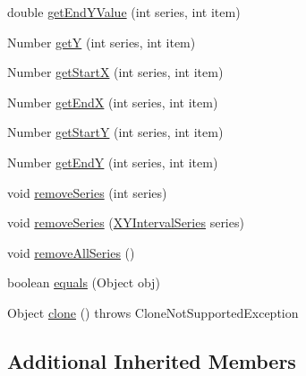 \begin{DoxyCompactItemize}
\item 
double \mbox{\hyperlink{classorg_1_1jfree_1_1data_1_1xy_1_1_x_y_interval_series_collection_af64aae33d2436a5f394e0dd3ebbbbb9f}{get\+End\+Y\+Value}} (int series, int item)
\item 
Number \mbox{\hyperlink{classorg_1_1jfree_1_1data_1_1xy_1_1_x_y_interval_series_collection_a466c1c681b804f65c56985ea65ec2a20}{getY}} (int series, int item)
\item 
Number \mbox{\hyperlink{classorg_1_1jfree_1_1data_1_1xy_1_1_x_y_interval_series_collection_af5acf7bf95c09bf1550d5d6a05f6ce4b}{get\+StartX}} (int series, int item)
\item 
Number \mbox{\hyperlink{classorg_1_1jfree_1_1data_1_1xy_1_1_x_y_interval_series_collection_a9e6ffe8c1b1e338f82d346ff9de9c143}{get\+EndX}} (int series, int item)
\item 
Number \mbox{\hyperlink{classorg_1_1jfree_1_1data_1_1xy_1_1_x_y_interval_series_collection_a7ab36e2809364dab0db10b575f58ae14}{get\+StartY}} (int series, int item)
\item 
Number \mbox{\hyperlink{classorg_1_1jfree_1_1data_1_1xy_1_1_x_y_interval_series_collection_abba1f60de92dc0c6d7bda0d064c04d70}{get\+EndY}} (int series, int item)
\item 
void \mbox{\hyperlink{classorg_1_1jfree_1_1data_1_1xy_1_1_x_y_interval_series_collection_a13cb4baef95e9d771957dd29eba3517e}{remove\+Series}} (int series)
\item 
void \mbox{\hyperlink{classorg_1_1jfree_1_1data_1_1xy_1_1_x_y_interval_series_collection_a8a84bd74eee4edbc30c98257d54a9f76}{remove\+Series}} (\mbox{\hyperlink{classorg_1_1jfree_1_1data_1_1xy_1_1_x_y_interval_series}{X\+Y\+Interval\+Series}} series)
\item 
void \mbox{\hyperlink{classorg_1_1jfree_1_1data_1_1xy_1_1_x_y_interval_series_collection_aa06178baa052ee01638d4b2a879685b5}{remove\+All\+Series}} ()
\item 
boolean \mbox{\hyperlink{classorg_1_1jfree_1_1data_1_1xy_1_1_x_y_interval_series_collection_aa03f5e3cdf1e57c8494677da68572357}{equals}} (Object obj)
\item 
Object \mbox{\hyperlink{classorg_1_1jfree_1_1data_1_1xy_1_1_x_y_interval_series_collection_a0924e8d892ccbe49756b0351e259425c}{clone}} ()  throws Clone\+Not\+Supported\+Exception 
\end{DoxyCompactItemize}
\subsection*{Additional Inherited Members}


